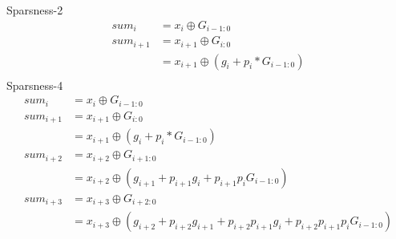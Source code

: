 Sparsness-2
\begin{equation*}
    \begin{split}
        sum_i &= x_i \oplus G_{i-1:0}\\
        sum_{i+1} &= x_{i+1} \oplus G_{i:0}\\
        &= x_{i+1} \oplus (g_i + p_i*G_{i-1:0})\\
    \end{split} 
\end{equation*}
Sparsness-4
\begin{equation*}
    \begin{split}
        sum_i &= x_i \oplus G_{i-1:0}\\
        sum_{i+1} &= x_{i+1} \oplus G_{i:0}\\
        &= x_{i+1} \oplus (g_i + p_i*G_{i-1:0})\\
        sum_{i+2} &= x_{i+2} \oplus G_{i+1:0}\\
        &= x_{i+2} \oplus (g_{i+1} + p_{i+1}g_i + p_{i+1}p_iG_{i-1:0})\\
        sum_{i+3} &= x_{i+3} \oplus G_{i+2:0}\\
        &= x_{i+3} \oplus (g_{i+2} + p_{i+2}g_{i+1} + p_{i+2}p_{i+1}g_i + p_{i+2}p_{i+1}p_iG_{i-1:0})\\
    \end{split} 
\end{equation*}


















